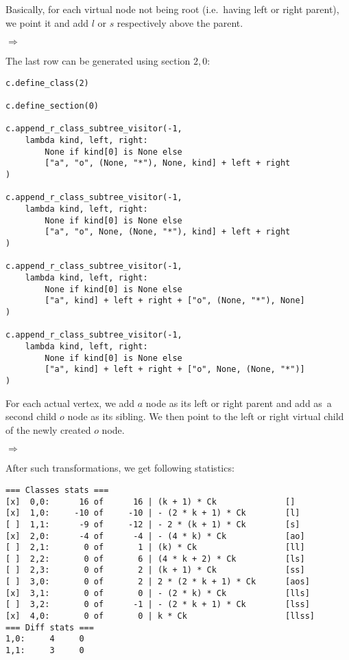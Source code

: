 \documentclass[final]{article}
\theoremstyle{definition}
\theoremstyle{definition}
\theoremstyle{remark}
\newcommand{\includeinlinesvg}[2]{\begin{minipage}{#1\textwidth}\end{minipage}}
\begin{document}
Basically, for each virtual node not being root (i.e.~having left or right parent), we point it and add \(l\) or \(s\) respectively above the parent.

\includeinlinesvg{.32}{lambda__trees_111__1_base}%
\(\Rightarrow\)
\includeinlinesvg{.32}{lambda__trees_101__0}%
\includeinlinesvg{.32}{lambda__trees_112__0}%

The last row can be generated using section \(2, 0\):

\begin{lstlisting}
c.define_class(2)

c.define_section(0)

c.append_r_class_subtree_visitor(-1,
    lambda kind, left, right:
        None if kind[0] is None else
        ["a", "o", (None, "*"), None, kind] + left + right
)

c.append_r_class_subtree_visitor(-1,
    lambda kind, left, right:
        None if kind[0] is None else
        ["a", "o", None, (None, "*"), kind] + left + right
)

c.append_r_class_subtree_visitor(-1,
    lambda kind, left, right:
        None if kind[0] is None else
        ["a", kind] + left + right + ["o", (None, "*"), None]
)

c.append_r_class_subtree_visitor(-1,
    lambda kind, left, right:
        None if kind[0] is None else
        ["a", kind] + left + right + ["o", None, (None, "*")]
)
\end{lstlisting}

For each actual vertex, we add \(a\) node as its left or right parent and add as~a second child \(o\) node as its sibling. We then point to the left or right virtual child of the newly created \(o\) node.

\includeinlinesvg{.20}{lambda__trees_200__0_base}%
\(\Rightarrow\)
\includeinlinesvg{.20}{lambda__trees_200__0}%
\includeinlinesvg{.20}{lambda__trees_201__0}%
\includeinlinesvg{.20}{lambda__trees_202__0}%
\includeinlinesvg{.20}{lambda__trees_203__0}%

After such transformations, we get following statistics:

\begin{lstlisting}
=== Classes stats ===
[x]  0,0:      16 of      16 | (k + 1) * Ck              []
[x]  1,0:     -10 of     -10 | - (2 * k + 1) * Ck        [l]
[ ]  1,1:      -9 of     -12 | - 2 * (k + 1) * Ck        [s]
[x]  2,0:      -4 of      -4 | - (4 * k) * Ck            [ao]
[ ]  2,1:       0 of       1 | (k) * Ck                  [ll]
[ ]  2,2:       0 of       6 | (4 * k + 2) * Ck          [ls]
[ ]  2,3:       0 of       2 | (k + 1) * Ck              [ss]
[ ]  3,0:       0 of       2 | 2 * (2 * k + 1) * Ck      [aos]
[x]  3,1:       0 of       0 | - (2 * k) * Ck            [lls]
[ ]  3,2:       0 of      -1 | - (2 * k + 1) * Ck        [lss]
[x]  4,0:       0 of       0 | k * Ck                    [llss]
=== Diff stats ===
1,0:     4     0
1,1:     3     0
\end{lstlisting}
\end{document}
